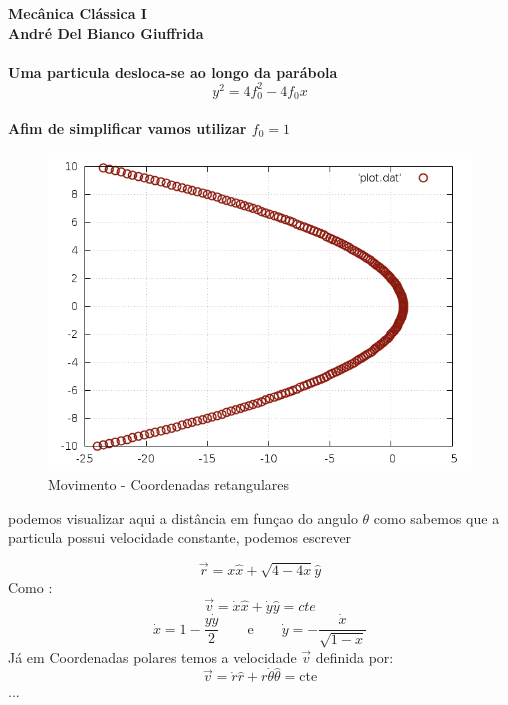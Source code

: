 \documentclass[a4paper,12pt]{exam}
\begin{document}
\begingroup 
	  \bf \Large Mecânica Clássica I\\
	  \indent \normalsize André Del Bianco Giuffrida
	\endgroup
	\\ \quad
	\\
	Uma particula desloca-se ao longo da parábola
	\[ y^2 = 4f_{0}^{2} -4f_0 x\] \\
	Afim de simplificar vamos utilizar $f_0 = 1$  \\
		\begin{figure}[h]
			\centering
			\includegraphics[scale=0.3]{2o0.png}
			\caption{Movimento - Coordenadas retangulares}
		\end{figure}

		podemos visualizar aqui a distância em funçao do angulo $\theta$
		como sabemos que a particula possui velocidade constante, podemos escrever
		
		\[ \vec{r} = x \hat x + \sqrt{4-4x} \hat y\]
		Como :
		\[ \vec{v} = \dot x \hat x + \dot y \hat y = cte \]
		\[\dot x = 1 - \frac{y \dot y}{2}  \quad \quad \text{e} \quad \quad \dot y = -\frac{\dot x}{\sqrt{1-x}}\]
		Já em Coordenadas polares temos a velocidade $\vec{v}$ definida por:
		\[\vec{v} = \dot r \hat r + r \dot \theta \hat \theta = \text{cte}\]
		...
		
\end{document}
